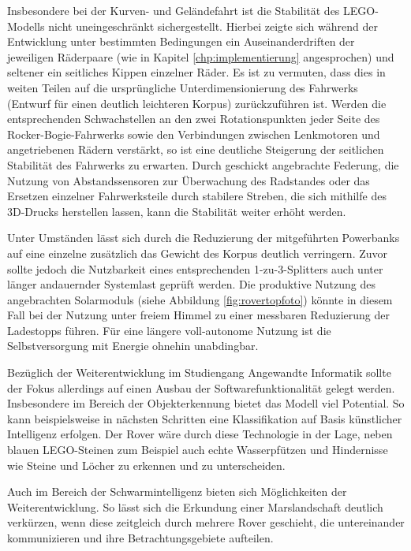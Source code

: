 Insbesondere bei der Kurven- und Geländefahrt ist die Stabilität des LEGO-Modells nicht uneingeschränkt sichergestellt.
Hierbei zeigte sich während der Entwicklung unter bestimmten Bedingungen ein Auseinanderdriften der jeweiligen Räderpaare (wie in Kapitel \ref{chp:implementierung} angesprochen) und seltener ein seitliches Kippen einzelner Räder.
Es ist zu vermuten, dass dies in weiten Teilen auf die ursprüngliche Unterdimensionierung des Fahrwerks (Entwurf für einen deutlich leichteren Korpus) zurückzuführen ist.
Werden die entsprechenden Schwachstellen an den zwei Rotationspunkten jeder Seite des Rocker-Bogie-Fahrwerks sowie den Verbindungen zwischen Lenkmotoren und angetriebenen Rädern verstärkt, so ist eine deutliche Steigerung der seitlichen Stabilität des Fahrwerks zu erwarten.
Durch geschickt angebrachte Federung, die Nutzung von Abstandssensoren zur Überwachung des Radstandes oder das Ersetzen einzelner Fahrwerksteile durch stabilere Streben, die sich mithilfe des 3D-Drucks herstellen lassen, kann die Stabilität weiter erhöht werden.

Unter Umständen lässt sich durch die Reduzierung der mitgeführten Powerbanks auf eine einzelne zusätzlich das Gewicht des Korpus deutlich verringern.
Zuvor sollte jedoch die Nutzbarkeit eines entsprechenden 1-zu-3-Splitters auch unter länger andauernder Systemlast geprüft werden.
Die produktive Nutzung des angebrachten Solarmoduls (siehe Abbildung \ref{fig:rovertopfoto}) könnte in diesem Fall bei der Nutzung unter freiem Himmel zu einer messbaren Reduzierung der Ladestopps führen.
Für eine längere voll-autonome Nutzung ist die Selbstversorgung mit Energie ohnehin unabdingbar.

Bezüglich der Weiterentwicklung im Studiengang Angewandte Informatik sollte der Fokus allerdings auf einen Ausbau der Softwarefunktionalität gelegt werden.
Insbesondere im Bereich der Objekterkennung bietet das Modell viel Potential.
So kann beispielsweise in nächsten Schritten eine Klassifikation auf Basis künstlicher Intelligenz erfolgen.
Der Rover wäre durch diese Technologie in der Lage, neben blauen LEGO-Steinen zum Beispiel auch echte Wasserpfützen und Hindernisse wie Steine und Löcher zu erkennen und zu unterscheiden.

Auch im Bereich der Schwarmintelligenz bieten sich Möglichkeiten der Weiterentwicklung.
So lässt sich die Erkundung einer Marslandschaft deutlich verkürzen, wenn diese zeitgleich durch mehrere Rover geschieht, die untereinander kommunizieren und ihre Betrachtungsgebiete aufteilen.
